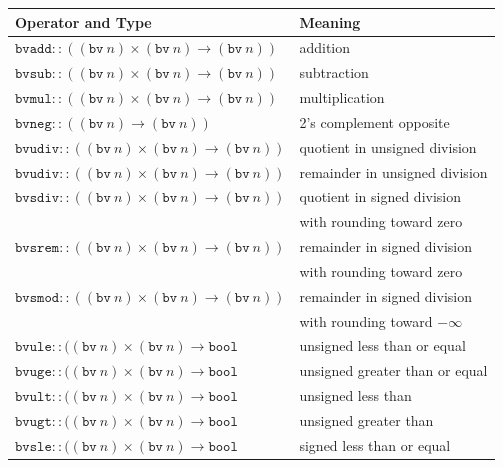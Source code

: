 \documentclass[11pt,twoside,fleqn,openright,titlepage]{cslreport}
\begin{document}
\begin{table}
\begin{tabular}{|l|l|}
\hline
Operator and Type & Meaning\\
\hline
$\mathtt{bvadd}::((\mathtt{bv}\ n)\times (\mathtt{bv}\ n) \rightarrow (\mathtt{bv}\ n))$ &
addition\\
$\mathtt{bvsub}::((\mathtt{bv}\ n)\times (\mathtt{bv}\ n) \rightarrow (\mathtt{bv}\ n))$ &
subtraction\\
$\mathtt{bvmul}::((\mathtt{bv}\ n)\times (\mathtt{bv}\ n) \rightarrow (\mathtt{bv}\ n))$ &
multiplication\\
$\mathtt{bvneg}::((\mathtt{bv}\ n) \rightarrow (\mathtt{bv}\ n))$ &
2's complement opposite\\
\hline
$\mathtt{bvudiv}::((\mathtt{bv}\ n)\times (\mathtt{bv}\ n) \rightarrow (\mathtt{bv}\ n))$ &
quotient in unsigned division \\
$\mathtt{bvudiv}::((\mathtt{bv}\ n)\times (\mathtt{bv}\ n) \rightarrow (\mathtt{bv}\ n))$ &
remainder in unsigned division \\
$\mathtt{bvsdiv}::((\mathtt{bv}\ n)\times (\mathtt{bv}\ n) \rightarrow (\mathtt{bv}\ n))$ &
quotient in signed division \\
& with rounding toward zero\\
$\mathtt{bvsrem}::((\mathtt{bv}\ n)\times (\mathtt{bv}\ n) \rightarrow (\mathtt{bv}\ n))$ &
remainder in signed division \\
& with rounding toward zero\\
$\mathtt{bvsmod}::((\mathtt{bv}\ n)\times (\mathtt{bv}\ n) \rightarrow (\mathtt{bv}\ n))$ &
remainder in signed division\\
& with rounding toward $-\infty$\\
\hline
$\mathtt{bvule}::((\mathtt{bv}\ n)\times (\mathtt{bv}\ n) \rightarrow \mathtt{bool}$ &
unsigned less than or equal\\
$\mathtt{bvuge}::((\mathtt{bv}\ n)\times (\mathtt{bv}\ n) \rightarrow \mathtt{bool}$ &
unsigned greater than or equal\\
$\mathtt{bvult}::((\mathtt{bv}\ n)\times (\mathtt{bv}\ n) \rightarrow \mathtt{bool}$ &
unsigned less than\\
$\mathtt{bvugt}::((\mathtt{bv}\ n)\times (\mathtt{bv}\ n) \rightarrow \mathtt{bool}$ &
unsigned greater than\\
$\mathtt{bvsle}::((\mathtt{bv}\ n)\times (\mathtt{bv}\ n) \rightarrow \mathtt{bool}$ &
signed less than or equal\\

\end{tabular}
\end{table}
\end{document}
